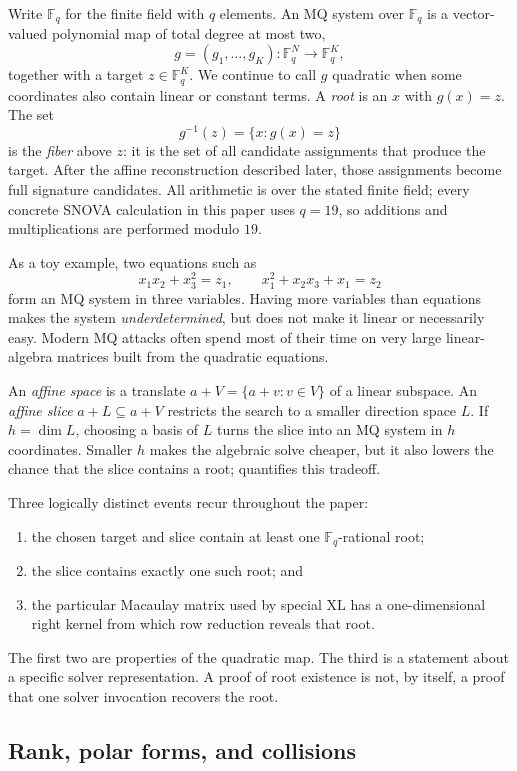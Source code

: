 \documentclass[11pt]{article}
\newcommand{\F}{\mathbb F}
\newcommand{\SNOVA}{\textsf{SNOVA}}
\begin{document}
Write $\F_q$ for the finite field with $q$ elements.  An MQ system over
$\F_q$ is a vector-valued polynomial map of total degree at most two,
\[
  g=(g_1,\ldots,g_K):\F_q^N\longrightarrow\F_q^K,
\]
together with a target $z\in\F_q^K$.  We continue to call $g$ quadratic when
some coordinates also contain linear or constant terms.  A \emph{root} is an
$x$ with $g(x)=z$.
The set
\[
  g^{-1}(z)=\{x:g(x)=z\}
\]
is the \emph{fiber} above $z$: it is the set of all candidate assignments
that produce the target.  After the affine reconstruction described later,
those assignments become full signature candidates.  All arithmetic is over
the stated finite field; every concrete \SNOVA{} calculation in this paper uses
$q=19$, so additions and multiplications are performed modulo $19$.

As a toy example, two equations such as
\[
 x_1x_2+x_3^2=z_1,
 \qquad
 x_1^2+x_2x_3+x_1=z_2
\]
form an MQ system in three variables.  Having more variables than equations
makes the system \emph{underdetermined}, but does not make it linear or
necessarily easy.  Modern MQ attacks often spend most of their time on very
large linear-algebra matrices built from the quadratic equations.

An \emph{affine space} is a translate $a+V=\{a+v:v\in V\}$ of a linear
subspace.  An \emph{affine slice} $a+L\subseteq a+V$ restricts the search to a
smaller direction space $L$.  If $h=\dim L$, choosing a basis of $L$ turns the
slice into an MQ system in $h$ coordinates.  Smaller $h$ makes the algebraic
solve cheaper, but it also lowers the chance that the slice contains a root;
 quantifies this tradeoff.

Three logically distinct events recur throughout the paper:
\begin{enumerate}[label=(\roman*),itemsep=2pt]
\item the chosen target and slice contain at least one $\F_q$-rational root;
\item the slice contains exactly one such root; and
\item the particular Macaulay matrix used by special XL has a one-dimensional
      right kernel from which row reduction reveals that root.
\end{enumerate}
The first two are properties of the quadratic map.  The third is a statement
about a specific solver representation.  A proof of root existence is not, by
itself, a proof that one solver invocation recovers the root.

\subsection{Rank, polar forms, and collisions}
\end{document}
